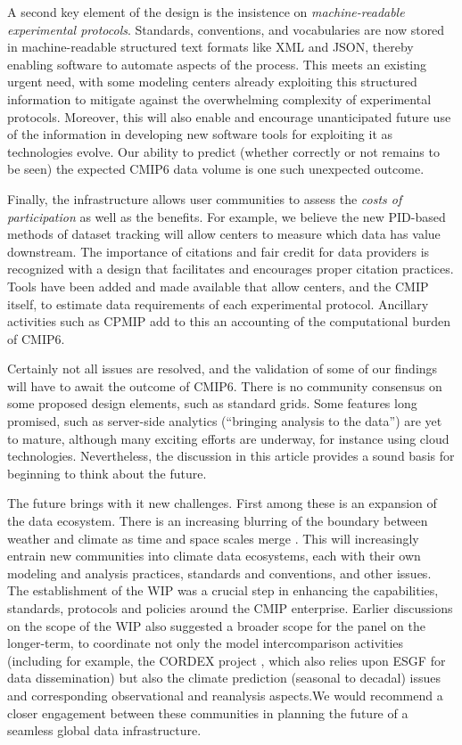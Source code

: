 \documentclass[gmd,manuscript]{copernicus}
\begin{document}
A second key element of the design is the insistence on
\emph{machine-readable experimental protocols}. Standards,
conventions, and vocabularies are now stored in machine-readable
structured text formats like XML and JSON, thereby enabling software
to automate aspects of the process. This meets an existing urgent
need, with some modeling centers already exploiting this structured
information to mitigate against the overwhelming complexity of
experimental protocols. Moreover, this will also enable and encourage
unanticipated future use of the information in developing new software
tools for exploiting it as technologies evolve. Our ability to predict
(whether correctly or not remains to be seen) the expected CMIP6 data
volume is one such unexpected outcome.

Finally, the infrastructure allows user communities to assess the
\emph{costs of participation} as well as the benefits. For example, we
believe the new PID-based methods of dataset tracking will allow
centers to measure which data has value downstream. The importance of
citations and fair credit for data providers is recognized with a
design that facilitates and encourages proper citation practices.
Tools have been added and made available that allow centers, and the
CMIP itself, to estimate data requirements of each experimental
protocol. Ancillary activities such as CPMIP add to this an accounting
of the computational burden of CMIP6.

Certainly not all issues are resolved, and the validation of some of
our findings will have to await the outcome of CMIP6. There is no
community consensus on some proposed design elements, such as standard
grids. Some features long promised, such as server-side analytics
(``bringing analysis to the data'') are yet to mature, although many
exciting efforts are underway, for instance using cloud technologies.
Nevertheless, the discussion in this article provides a sound basis
for beginning to think about the future.

The future brings with it new challenges. First among these is an
expansion of the data ecosystem. There is an increasing blurring of
the boundary between weather and climate as time and space scales
merge \citep{ref:hoskins2013}. This will increasingly entrain new
communities into
climate data ecosystems, each with their own modeling and analysis
practices, standards and conventions, and other issues. The
establishment of the WIP was a crucial step in enhancing the
capabilities, standards, protocols and policies around the CMIP
enterprise. Earlier discussions on the scope of the WIP also suggested
a broader scope for the panel on the longer-term, to coordinate not
only the model intercomparison activities (including for example, the
CORDEX project \citep{ref:lakeetal2017}, which also relies upon ESGF
for data dissemination) but also the climate prediction (seasonal to
decadal) issues and corresponding observational and reanalysis
aspects.We would recommend a closer engagement between these
communities in planning the future of a seamless global data
infrastructure.
\end{document}
